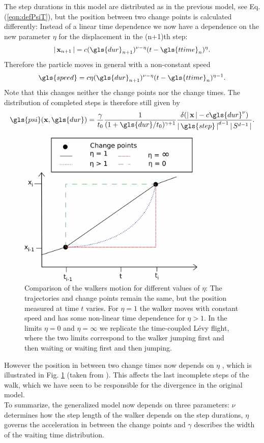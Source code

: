 The step durations in this model are distributed as in the previous model, see Eq. (\ref{eqn:defPsiT}), but the position between two change points is calculated differently: Instead of a linear time dependence we now have a dependence on the new parameter $\eta$ for the displacement in the (n+1)th step:
%
\begin{align}
\abs{\ve{x}_{n+1}} = c (\gls{dur}_{n+1})^{\nu-\eta} (t-\gls{ttime}_n)^{\eta} .
\end{align}
%
Therefore the particle moves in general with a non-constant speed  
%
\begin{align}
\gls{speed} = c \eta (\gls{dur}_{n+1})^{\nu-\eta} (t-\gls{ttime}_n)^{\eta-1} .
\end{align}
%
Note that this changes neither the change points nor the change times. The distribution of completed steps is therefore still given by 
%
\begin{align}
\gls{psi}(\ve{x}, \gls{dur} ) = \frac{\gamma}{t_0} \frac{1}{(1+\gls{dur}/t_0)^{\gamma+1}}  \frac{\delta(\abs{\ve{x}} - c \gls{dur}^{\nu}) }{\abs{\gls{step}}^{d-1} \abs{S^{d-1}}}  .
\end{align}
%
\begin{figure}[!htb]
\begin{center}
\includegraphics[width=90mm]{pics/turningPoints.png}
\caption{Comparison of the walkers motion for different values of $\eta$: The trajectories and change points remain the same, but the position measured at time $t$ varies. For $\eta = 1$ the walker moves with constant speed and has some non-linear time dependence for $\eta > 1$. In the limits $\eta = 0$ and $\eta = \infty$ we replicate the time-coupled L\'evy flight, where the two limits correspond to the walker jumping first and then waiting or waiting first and then jumping. 
\label{fig:turningPoints}}
\end{center}
\end{figure}
%
However the position in between two change times now depends on $\eta$ \cite{radons2018}, which is  illustrated in Fig. \ref{fig:turningPoints} (taken from \cite{bothe}). This affects the last incomplete steps of the walk, which we have seen to be responsible for the divergence in the original model. \\
To summarize, the generalized model now depends on three parameters: $\nu$ determines how the step length of the walker depends on the step durations, $\eta$ governs the acceleration in between the change points and $\gamma$ describes the width of the waiting time distribution. 


